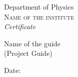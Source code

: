 \newpage
\thispagestyle{empty}

\begin{center}

\huge{Department of Physics}\\[0.5cm]
\normalsize
\textsc{Name of the institute}\\[2.0cm]

\emph{\LARGE Certificate}\\[2.5cm]
\end{center}
\normalsize 


\vfill


\begin{flushright}
Name of the guide\\
(Project Guide)\\
\end{flushright}
\begin{flushleft}
Date:
\end{flushleft}
